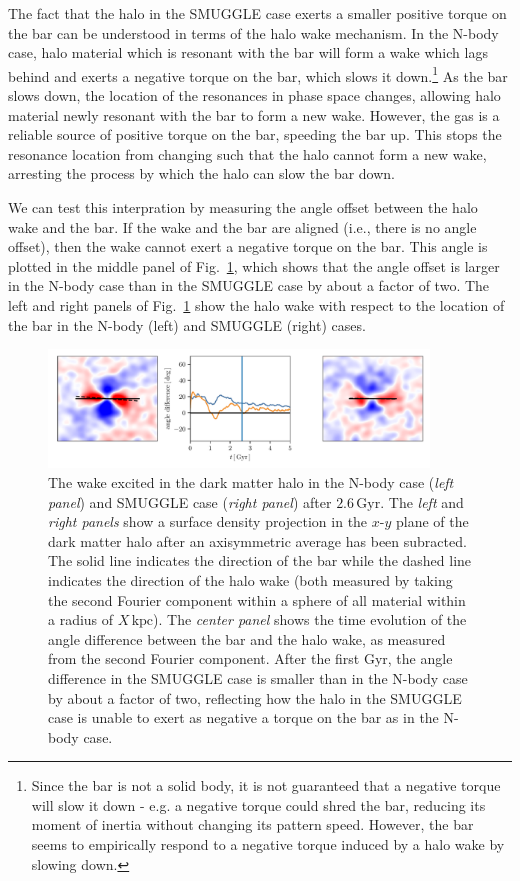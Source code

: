 \documentclass{natureprintstyle}
\begin{document}
The fact that the halo in the SMUGGLE case exerts a smaller positive torque on
the bar can be understood in terms of the halo wake mechanism. In the N-body
case, halo material which is resonant with the bar will form a wake which lags
behind and exerts a negative torque on the bar, which slows it
down.\cite{1984MNRAS.209..729T, 1985MNRAS.213..451W,
1992ApJ...400...80H}\footnote{Since the bar is not a solid body, it is not
guaranteed that a negative torque will slow it down - e.g. a negative torque
could shred the bar, reducing its moment of inertia without changing its
pattern speed. However, the bar seems to empirically respond to a negative
torque induced by a halo wake by slowing down.} As the bar slows down, the
location of the resonances in phase space changes, allowing halo material
newly resonant with the bar to form a new wake. However, the gas is a reliable
source of positive torque on the bar, speeding the bar up. This stops the
resonance location from changing such that the halo cannot form a new wake,
arresting the process by which the halo can slow the bar down.

We can test this interpration by measuring the angle offset between the halo
wake and the bar. If the wake and the bar are aligned (i.e., there is no angle
offset), then the wake cannot exert a negative torque on the bar. This angle
is plotted in the middle panel of Fig.~\ref{fig:wake}, which shows that the
angle offset is larger in the N-body case than in the SMUGGLE case by about a
factor of two. The left and right panels of Fig.~\ref{fig:wake} show the halo
wake with respect to the location of the bar in the N-body (left) and SMUGGLE
(right) cases.

\begin{figure}[h]%
\centering
\includegraphics[width=0.9\textwidth]{fig/fig3.pdf}
\caption{The wake excited in the dark matter halo in the N-body case
(\textit{left panel}) and SMUGGLE case (\textit{right panel}) after
$2.6\,\textrm{Gyr}$. The \textit{left} and \textit{right panels} show a
surface density projection in the $x$-$y$ plane of the dark matter halo after
an axisymmetric average has been subracted. The solid line indicates the
direction of the bar while the dashed line indicates the direction of the halo
wake (both measured by taking the second Fourier component within a sphere of
all material within a radius of $X\,\textrm{kpc}$). The \textit{center panel}
shows the time evolution of the angle difference between the bar and the halo
wake, as measured from the second Fourier component. After the first Gyr, the
angle difference in the SMUGGLE case is smaller than in the N-body case by
about a factor of two, reflecting how the halo in the SMUGGLE case is unable
to exert as negative a torque on the bar as in the N-body
case.}\label{fig:wake}
\end{figure}
\end{document}
